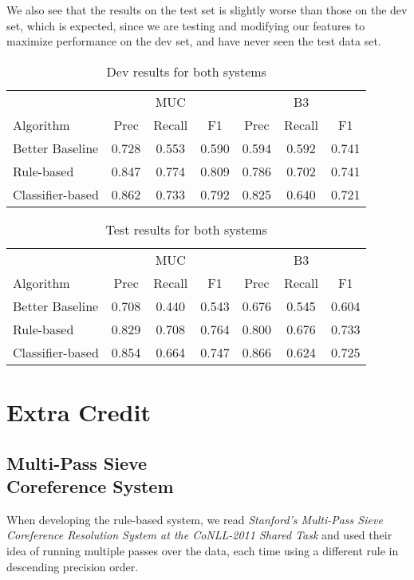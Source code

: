 \documentclass[12pt, twocolumn]{article}
\begin{document}
We also see that the results on the test set is slightly worse than those on the dev set, which is expected, since we are testing and modifying our features to maximize performance on the dev set, and have never seen the test data set.
\begin{table}[H]
\begin{minipage}{\textwidth}
\centering
\begin{tabular}{l|c c c|c c c}
\hline
& & MUC & & & B3 & \\
Algorithm & Prec & Recall & F1 & Prec & Recall & F1 \\\hline
Better Baseline & 0.728 & 0.553 & 0.590 & 0.594 & 0.592 & 0.741 \\\hline
Rule-based & 0.847 & 0.774 & 0.809 & 0.786 & 0.702 & 0.741 \\\hline  
Classifier-based & 0.862 & 0.733 & 0.792 & 0.825 & 0.640 & 0.721 \\\hline
\end{tabular}
\caption{Dev results for both systems}\label{tab:devresults}
\end{minipage}
\end{table}
\begin{table}[H]
\begin{minipage}{\textwidth}
\centering
\begin{tabular}{l|c c c|c c c}
\hline
& & MUC & & & B3 & \\
Algorithm & Prec & Recall & F1 & Prec & Recall & F1 \\\hline
Better Baseline & 0.708 & 0.440 & 0.543 & 0.676 & 0.545 & 0.604 \\\hline
Rule-based & 0.829 & 0.708 & 0.764 & 0.800 & 0.676 & 0.733 \\\hline  
Classifier-based & 0.854 & 0.664 & 0.747 & 0.866 & 0.624 & 0.725 \\\hline
\end{tabular}
\caption{Test results for both systems}\label{tab:testresults}
\end{minipage}
\end{table}
\section{Extra Credit}
\subsection{Multi-Pass Sieve \\Coreference System}
When developing the rule-based system, we read 
\textit{Stanford’s Multi-Pass Sieve Coreference Resolution System at the CoNLL-2011 Shared Task} and used their idea of running multiple passes over the data, each time using a different rule in descending precision order.
\end{document}
